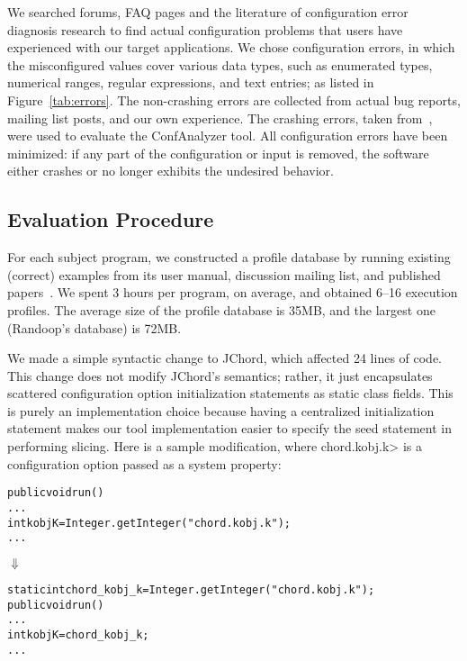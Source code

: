 We searched forums, FAQ pages and the literature of
configuration error diagnosis research to find actual
configuration problems that users have experienced with our
target applications. 
We chose \errors configuration errors, in which
the misconfigured values cover various data types, such as enumerated types,
numerical ranges, regular expressions, and text entries;
as listed in Figure~\ref{tab:errors}. The \noncrash non-crashing errors
are collected from actual bug reports, mailing list posts, and our own experience.
The \crash crashing errors, taken from~\cite{Rabkin:2011:PPC},
were used to evaluate the ConfAnalyzer tool.
All \errors configuration errors have been minimized: if
any part of the configuration or input is removed, the software
either crashes or no longer exhibits the undesired behavior.



\subsection{Evaluation Procedure}

For each subject program, we constructed a profile database
by running existing (correct) examples from its user manual, discussion
mailing list, and published papers~\cite{PachecoLET2007, Beschastnikh:2011, Rabkin:2011:PPC}.
We spent 3 hours per program, on average, and obtained 6--16 execution profiles.
The average size of the profile database is 35MB, and the largest one
(Randoop's database) is 72MB.

We made a simple syntactic change to JChord, which affected 24 
lines of code. This change
does not modify JChord's semantics; rather, it just encapsulates
scattered configuration option initialization statements 
as static class fields. This is purely an implementation
choice because having a centralized initialization statement
makes our tool implementation easier to specify the seed statement
in performing slicing. Here is a sample modification, where 
\<chord.kobj.k> 
is a configuration option
passed as a system property:


\begin{CodeOut}
\begin{alltt}
public void run() \ttlcb
  ...
  int kobjK = Integer.getInteger("chord.kobj.k");
  ...
\ttrcb
\end{alltt}
\end{CodeOut}
\vspace{-4mm}
\hspace{20mm}$\Downarrow$ 
\begin{CodeOut}
\begin{alltt}
static int chord\_kobj\_k = Integer.getInteger("chord.kobj.k");
public void run() \ttlcb
  ...
  int kobjK = chord\_kobj\_k; 
  ...
\ttrcb
\end{alltt}
\end{CodeOut}


